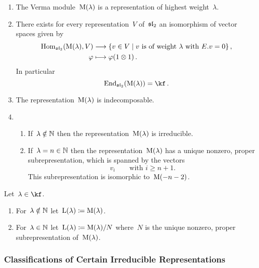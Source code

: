 \documentclass[a4paper, 11pt, oneside]{scrartcl}
\begin{document}
\begin{proposition}
\begin{enumerate}
\begin{figure}
{        }
        \label{graphical representation of verma module}
      \end{figure}
    \item
      The Verma module~$\operatorname{M}(\lambda)$ is a representation of highest weight~$\lambda$.
    \item
      There exists for every representation~$V$ of~$\mathfrak{sl}_2$ an isomorphism of vector spaces given by
      \begin{align*}
        \Hom_{\sllie_2}( \verma(\lambda), V )
        &\longto
        \{
          v \in V
        \suchthat
          \text{$v$ is of weight~$\lambda$ with~$E.v = 0$}
        \} \,,
        \\
        \varphi
        &\longmapsto
        \varphi(1 \tensor 1) \,.
      \end{align*}
      In particular
      \[
        \End_{\sllie_2}( \verma(\lambda) )
        =
        \kf \,.
      \]
    \item
      The representation~$\operatorname{M}(\lambda)$ is indecomposable.
    \item
      \begin{enumerate}
        \item
          If~$\lambda \notin \mathbb{N}$ then the representation~$\operatorname{M}(\lambda)$ is irreducible.
        \item
          If~$\lambda = n \in \mathbb{N}$ then the representation~$\operatorname{M}(\lambda)$ has a unique nonzero, proper subrepresentation, which is spanned by the vectors
          \[
            v_i
            \qquad
            \text{with~$i \geq n+1$.}
          \]
          This subrepresentation is isomorphic to~$\operatorname{M}(-n-2)$.
      \end{enumerate}
  \end{enumerate}
\end{proposition}

\begin{definition}
  Let~$\lambda \in \kf$.
  \begin{enumerate}
    \item
      For~$\lambda \notin \mathbb{N}$ let~$\operatorname{L}(\lambda) \coloneqq \operatorname{M}(\lambda)$.
    \item
      For~$\lambda \in \mathbb{N}$ let~$\operatorname{L}(\lambda) \coloneqq \operatorname{M}(\lambda)/N$ where~$N$ is the unique nonzero, proper subrepresentation of~$\operatorname{M}(\lambda)$.
  \end{enumerate}
\end{definition}

\subsubsection{Classifications of Certain Irreducible Representations}
\end{document}
